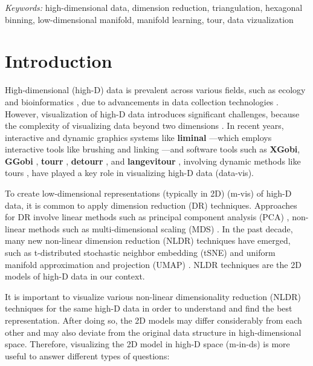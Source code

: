 \documentclass[
  12pt]{article}
\begin{document}
\noindent%
{\it Keywords:} high-dimensional data, dimension
reduction, triangulation, hexagonal binning, low-dimensional
manifold, manifold learning, tour, data vizualization
\vfill

\newpage
{} %


\section{Introduction}\label{sec-intro}

High-dimensional (high-D) data is prevalent across various fields, such
as ecology and bioinformatics \citep{Guo2023}, due to advancements in
data collection technologies \citep{Johnstone2009, ayesha2020overview}.
However, visualization of high-D data introduces significant challenges,
because the complexity of visualizing data beyond two dimensions
\citep{Jia2022}. In recent years, interactive and dynamic graphics
systems like \textbf{liminal} \citep{article21} ---which employs
interactive tools like brushing and linking \citep{article58}---and
software tools such as \textbf{XGobi}, \textbf{GGobi} \citep{article60},
\textbf{tourr} \citep{article61}, \textbf{detourr} \citep{article22},
and \textbf{langevitour} \citep{article09}, involving dynamic methods
like tours \citep{Asimov1985}, have played a key role in visualizing
high-D data (data-vis).

To create low-dimensional representations (typically in 2D) (m-vis)
\citep{article59} of high-D data, it is common to apply dimension
reduction (DR) techniques. Approaches for DR involve linear methods such
as principal component analysis (PCA) \citep{Karl1901}, non-linear
methods such as multi-dimensional scaling (MDS) \citep{Torgerson1967}.
In the past decade, many new non-linear dimension reduction (NLDR)
techniques have emerged, such as t-distributed stochastic neighbor
embedding (tSNE) \citep{Laurens2008} and uniform manifold approximation
and projection (UMAP) \citep{Leland2018}. NLDR techniques are the 2D
models of high-D data in our context.

It is important to visualize various non-linear dimensionality reduction
(NLDR) techniques for the same high-D data in order to understand and
find the best representation. After doing so, the 2D models may differ
considerably from each other and may also deviate from the original data
structure in high-dimensional space. Therefore, visualizing the 2D model
in high-D space (m-in-ds) is more useful to answer different types of
questions:
\end{document}
